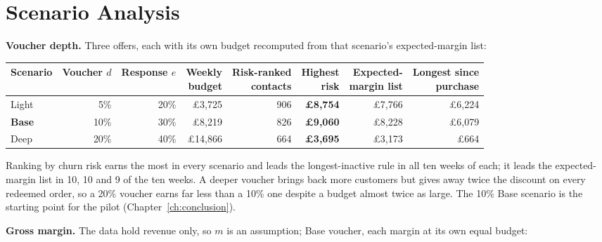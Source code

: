 \section{Scenario Analysis}
\label{sec:7-5}

\textbf{Voucher depth.} Three offers, each with its own budget recomputed from that scenario's expected-margin list:

\begin{center}
\footnotesize
\setlength{\tabcolsep}{4pt}
\begin{tabular}{@{}p{1.6cm}rrrrrrr@{}}
    \toprule
    Scenario & \shortstack[r]{Voucher\\$d$} & \shortstack[r]{Response\\$e$} & \shortstack[r]{Weekly\\budget} & \shortstack[r]{Risk-ranked\\contacts} & \shortstack[r]{Highest\\risk} & \shortstack[r]{Expected-\\margin list} & \shortstack[r]{Longest since\\purchase} \\
    \midrule
    Light & 5\% & 20\% & \pounds3,725 & 906 & \textbf{\pounds8,754} & \pounds7,766 & \pounds6,224 \\
    \textbf{Base} & 10\% & 30\% & \pounds8,219 & 826 & \textbf{\pounds9,060} & \pounds8,228 & \pounds6,079 \\
    Deep & 20\% & 40\% & \pounds14,866 & 664 & \textbf{\pounds3,695} & \pounds3,173 & \pounds664 \\
    \bottomrule
\end{tabular}
\end{center}

Ranking by churn risk earns the most in every scenario and leads the longest-inactive rule in all ten weeks of each; it leads the expected-margin list in 10, 10 and 9 of the ten weeks. A deeper voucher brings back more customers but gives away twice the discount on every redeemed order, so a 20\% voucher earns far less than a 10\% one despite a budget almost twice as large. The 10\% Base scenario is the starting point for the pilot (Chapter~\ref{ch:conclusion}).

\textbf{Gross margin.} The data hold revenue only, so $m$ is an assumption; Base voucher, each margin at its own equal budget:

